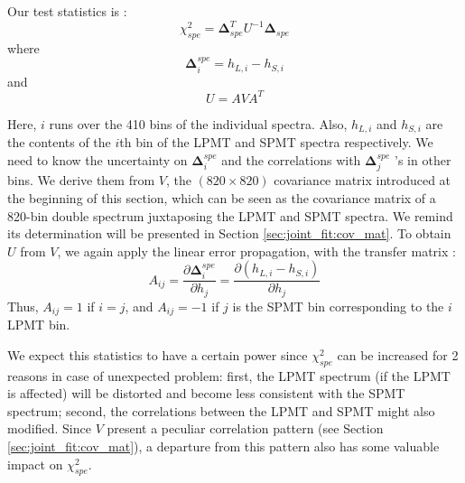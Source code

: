 \documentclass[../main.tex]{subfiles}
\begin{document}
Our test statistics is :
\begin{equation}
  \chi^2_{spe} = \bm{\Delta}_{spe}^T U^{-1} \bm{\Delta}_{spe}
\end{equation}
where
\begin{equation}
  \bm{\Delta}^{spe}_i = h_{L,i} - h_{S,i}
\end{equation}
and
\begin{equation}
  U = A V A^T
\end{equation}

Here, $i$ runs over the 410 bins of the individual spectra. Also, $h_{L,i}$ and $h_{S,i}$ are the contents of the $i$th bin of the LPMT and SPMT spectra respectively. We need to know the uncertainty on $\bm{\Delta}^{spe}_i$ and the correlations with $\bm{\Delta}^{spe}_j$ 's in other bins. We derive them from $V$, the $(820 \times 820)$ covariance matrix introduced at the beginning of this section, which can be seen as the covariance matrix of a 820-bin double spectrum juxtaposing the LPMT and SPMT spectra. We remind its determination will be presented in Section \ref{sec:joint_fit:cov_mat}. To obtain $U$ from $V$, we again apply the linear error propagation, with the transfer matrix :
\begin{equation}
  A_{ij} = \frac{\partial \bm{\Delta}^{spe}_i}{\partial h_j} = \frac{\partial(h_{L, i} - h_{S, i})}{\partial h_j}
\end{equation}
Thus, $A_{ij} = 1$ if $i = j$, and $A_{ij} = -1$ if $j$ is the SPMT bin corresponding to the $i$ LPMT bin.

We expect this statistics to have a certain power since $\chi^2_{spe}$ can be increased for 2 reasons in case of unexpected problem: first, the LPMT spectrum (if the LPMT is affected) will be distorted and become less consistent with the SPMT spectrum; second, the correlations between the LPMT and SPMT might also modified. Since $V$ present a peculiar correlation pattern (see Section \ref{sec:joint_fit:cov_mat}), a departure from this pattern also has some valuable impact on $\chi^2_{spe}$.


\end{document}
